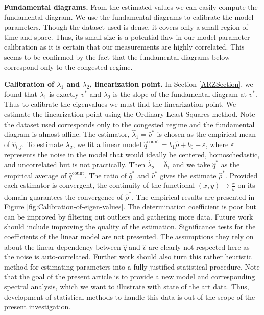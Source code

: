 \documentclass[5p,twocolumn]{elsarticle}
\DeclareMathOperator{\cnt}{count}
\begin{document}
\textbf{Fundamental diagrams.} From the estimated values we can easily compute the fundamental diagram. We use the fundamental diagrams to calibrate the model parameters. Though the dataset used is dense, it covers only a small region of time and space. Thus, its small size is a potential flaw in our model parameter calibration as it is certain that
our measurements are highly correlated. This seems
to be confirmed by the fact that the fundamental diagrams below correspond only to the congested regime. \

\textbf{Calibration of $\lambda_{1}$ and $\lambda_{2}$, linearization point.} In Section \ref{ARZSection}, we found that $\lambda_{1}$ is exactly $v^*$ and $\lambda_{2}$ is the slope of the fundamental diagram at $v^*$. Thus to calibrate the eigenvalues we must find the linearization point. We estimate the linearization point using the Ordinary Least Squares method. Note the dataset used corresponds only to the congested regime and the fundamental diagram is almost affine. The estimator, $\widehat{\lambda}_1=\widehat{v}^*$ is chosen as the empirical mean of $\widehat{v}_{i,j}$. To estimate $\lambda_{2}$, we fit a linear model $\widehat{q}^{\text{count}}=b_{1}\widehat{\rho}+b_{0}+\varepsilon$, where $\varepsilon$
represents the noise in the model that would ideally be centered,
homoschedastic, and uncorrelated but is not practically. Then $\widehat{\lambda}_{2}=\widehat{b}_{1}$ and we take $\widehat{q}^*$ as the empirical average of $\widehat{q}^{\cnt}$. The ratio of $\widehat{q}^*$ and $\widehat{v}^*$ gives the estimate $\widehat{\rho}^*$.
Provided each estimator is convergent, the continuity of the functional
$\left(x,y\right)\rightarrow\frac{x}{y}$ on its domain guarantees the convergence of $\widehat{\rho}^*$. The empirical results are presented in Figure \ref{fig:Calibration-of-eigen-values}. The determination coefficient is poor but can be improved by filtering out outliers and gathering more data. Future work should include improving the quality of the estimation. Significance tests for the coefficients of the linear model are not presented. The assumptions they rely on about
the linear dependency between $\widehat{q}$ and $\widehat{v}$ are clearly
not respected here as the noise is auto-correlated. Further work should also turn this rather heuristic method for estimating parameters
into a fully justified statistical procedure. Note that the goal of the present article is to provide a new model and corresponding spectral analysis, which we want to illustrate with state of the art data. Thus, development of statistical methods to handle this data is out of the scope of the present investigation.
\end{document}
